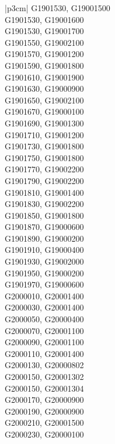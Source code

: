 \begin{customLongTable}{ |p{3cm}| }
G1901530, G19001500 \\ \hline
G1901530, G19001600 \\ \hline
G1901530, G19001700 \\ \hline
G1901550, G19002100 \\ \hline
G1901570, G19001200 \\ \hline
G1901590, G19001800 \\ \hline
G1901610, G19001900 \\ \hline
G1901630, G19000900 \\ \hline
G1901650, G19002100 \\ \hline
G1901670, G19000100 \\ \hline
G1901690, G19001300 \\ \hline
G1901710, G19001200 \\ \hline
G1901730, G19001800 \\ \hline
G1901750, G19001800 \\ \hline
G1901770, G19002200 \\ \hline
G1901790, G19002200 \\ \hline
G1901810, G19001400 \\ \hline
G1901830, G19002200 \\ \hline
G1901850, G19001800 \\ \hline
G1901870, G19000600 \\ \hline
G1901890, G19000200 \\ \hline
G1901910, G19000400 \\ \hline
G1901930, G19002000 \\ \hline
G1901950, G19000200 \\ \hline
G1901970, G19000600 \\ \hline
G2000010, G20001400 \\ \hline
G2000030, G20001400 \\ \hline
G2000050, G20000400 \\ \hline
G2000070, G20001100 \\ \hline
G2000090, G20001100 \\ \hline
G2000110, G20001400 \\ \hline
G2000130, G20000802 \\ \hline
G2000150, G20001302 \\ \hline
G2000150, G20001304 \\ \hline
G2000170, G20000900 \\ \hline
G2000190, G20000900 \\ \hline
G2000210, G20001500 \\ \hline
G2000230, G20000100 \\ \hline

\end{customLongTable}
